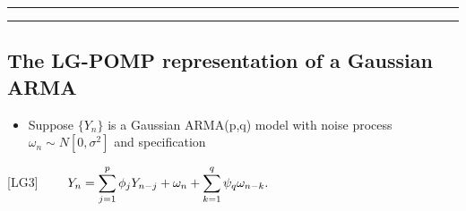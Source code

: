\documentclass[]{article}
\providecommand{\tightlist}{%
  \setlength{\itemsep}{0pt}\setlength{\parskip}{0pt}}
\begin{document}
\begin{center}\rule{0.5\linewidth}{\linethickness}\end{center}

\begin{center}\rule{0.5\linewidth}{\linethickness}\end{center}

\subsection{The LG-POMP representation of a Gaussian
ARMA}\label{the-lg-pomp-representation-of-a-gaussian-arma}

\begin{itemize}
\tightlist
\item
  Suppose \(\{Y_n\}\) is a Gaussian ARMA(p,q) model with noise process
  \(\omega_n\sim N[0,\sigma^2]\) and specification
\end{itemize}

{[}LG3{]}
\(\quad\quad\displaystyle Y_n = \sum_{j=1}^p \phi_j Y_{n-j} + \omega_n + \sum_{k=1}^q \psi_q \omega_{n-k}.\)
\end{document}
